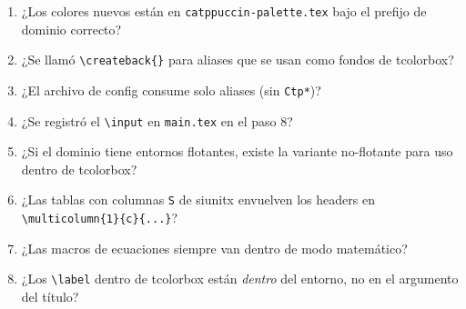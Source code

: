 \begin{enumerate}[label=$\square$, leftmargin=2em]
  \item ¿Los colores nuevos están en \texttt{catppuccin-palette.tex}
    bajo el prefijo de dominio correcto?
  \item ¿Se llamó \texttt{\textbackslash createback\{\}} para aliases
    que se usan como fondos de tcolorbox?
  \item ¿El archivo de config consume solo aliases (sin \texttt{Ctp*})?
  \item ¿Se registró el \texttt{\textbackslash input} en \texttt{main.tex}
    en el paso 8?
  \item ¿Si el dominio tiene entornos flotantes, existe la variante
    no-flotante para uso dentro de tcolorbox?
  \item ¿Las tablas con columnas \texttt{S} de siunitx envuelven los
    headers en \texttt{\textbackslash multicolumn\{1\}\{c\}\{...\}}?
  \item ¿Las macros de ecuaciones siempre van dentro de modo matemático?
  \item ¿Los \texttt{\textbackslash label} dentro de tcolorbox están
    \textit{dentro} del entorno, no en el argumento del título?
\end{enumerate}
